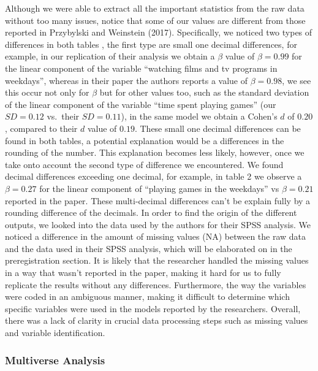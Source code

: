 \documentclass[man]{apa6}
\theoremstyle{definition}
\theoremstyle{definition}
\theoremstyle{definition}
\theoremstyle{remark}
\begin{document}
Although we were able to extract all the important statistics from the
raw data without too many issues, notice that some of our values are
different from those reported in Przybylski and Weinstein (2017).
Specifically, we noticed two types of differences in both tables , the
first type are small one decimal differences, for example, in our
replication of their analysis we obtain a \(\beta\) value of
\(\beta =0.99\) for the linear component of the variable
\enquote{watching films and tv programs in weekdays}, whereas in their
paper the authors reports a value of \(\beta=0.98\), we see this occur
not only for \(\beta\) but for other values too, such as the standard
deviation of the linear component of the variable \enquote{time spent
playing games} (our \(SD =0.12\) vs.~their \(SD =0.11\)), in the same
model we obtain a Cohen's \(d\) of \(0.20\), compared to their \(d\)
value of \(0.19\). These small one decimal differences can be found in
both tables, a potential explanation would be a differences in the
rounding of the number. This explanation becomes less likely, however,
once we take onto account the second type of difference we encountered.
We found decimal differences exceeding one decimal, for example, in
table 2 we observe a \(\beta =0.27\) for the linear component of
\enquote{playing games in the weekdays} vs \(\beta =0.21\) reported in
the paper. These multi-decimal differences can't be explain fully by a
rounding difference of the decimals. In order to find the origin of the
different outputs, we looked into the data used by the authors for their
SPSS analysis. We noticed a difference in the amount of missing values
(NA) between the raw data and the data used in their SPSS analysis,
which will be elaborated on in the preregistration section. It is likely
that the researcher handled the missing values in a way that wasn't
reported in the paper, making it hard for us to fully replicate the
results without any differences. Furthermore, the way the variables were
coded in an ambiguous manner, making it difficult to determine which
specific variables were used in the models reported by the researchers.
Overall, there was a lack of clarity in crucial data processing steps
such as missing values and variable identification.

\hypertarget{multiverse-analysis}{%
\subsubsection{Multiverse Analysis}\label{multiverse-analysis}}
\end{document}
